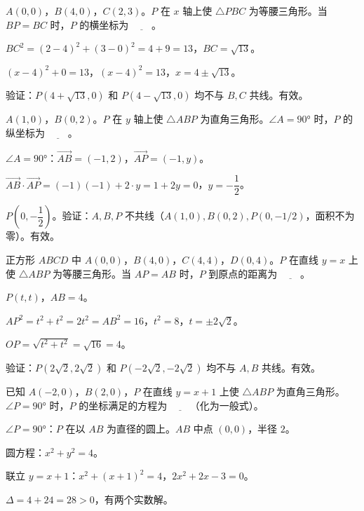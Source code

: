 \documentclass{exam-zh}
\begin{document}
\begin{question}[points=3]
  $A(0,0)$，$B(4,0)$，$C(2,3)$。$P$ 在 $x$ 轴上使 $\triangle PBC$ 为等腰三角形。当 $BP=BC$ 时，$P$ 的横坐标为 $\underline{\quad\quad}$。
  \fillin
  \paren[$x=4\pm\sqrt{13}$]
  \begin{solutionblock}
    $BC^2=(2-4)^2+(3-0)^2=4+9=13$，$BC=\sqrt{13}$。

$(x-4)^2+0=13$，$(x-4)^2=13$，$x=4\pm\sqrt{13}$。

验证：$P(4+\sqrt{13},0)$ 和 $P(4-\sqrt{13},0)$ 均不与 $B,C$ 共线。有效。
  \end{solutionblock}
\end{question}



\begin{question}[points=3]
  $A(1,0)$，$B(0,2)$。$P$ 在 $y$ 轴上使 $\triangle ABP$ 为直角三角形。$\angle A=90°$ 时，$P$ 的纵坐标为 $\underline{\quad\quad}$。
  \fillin
  \paren[$y=-\dfrac{1}{2}$]
  \begin{solutionblock}
    $\angle A=90°$：$\overrightarrow{AB}=(-1,2)$，$\overrightarrow{AP}=(-1,y)$。

$\overrightarrow{AB}\cdot\overrightarrow{AP}=(-1)(-1)+2\cdot y=1+2y=0$，$y=-\dfrac{1}{2}$。

$P\left(0,-\dfrac{1}{2}\right)$。验证：$A,B,P$ 不共线（$A(1,0),B(0,2),P(0,-1/2)$，面积不为零）。有效。
  \end{solutionblock}
\end{question}



\begin{question}[points=3]
  正方形 $ABCD$ 中 $A(0,0)$，$B(4,0)$，$C(4,4)$，$D(0,4)$。$P$ 在直线 $y=x$ 上使 $\triangle ABP$ 为等腰三角形。当 $AP=AB$ 时，$P$ 到原点的距离为 $\underline{\quad\quad}$。
  \fillin
  \paren[$4$]
  \begin{solutionblock}
    $P(t,t)$，$AB=4$。

$AP^2=t^2+t^2=2t^2=AB^2=16$，$t^2=8$，$t=\pm 2\sqrt{2}$。

$OP=\sqrt{t^2+t^2}=\sqrt{16}=4$。

验证：$P(2\sqrt{2},2\sqrt{2})$ 和 $P(-2\sqrt{2},-2\sqrt{2})$ 均不与 $A,B$ 共线。有效。
  \end{solutionblock}
\end{question}



\begin{question}[points=3]
  已知 $A(-2,0)$，$B(2,0)$，$P$ 在直线 $y=x+1$ 上使 $\triangle ABP$ 为直角三角形。$\angle P=90°$ 时，$P$ 的坐标满足的方程为 $\underline{\quad\quad}$（化为一般式）。
  \fillin
  \paren[$2x^2+2x-3=0$]
  \begin{solutionblock}
    $\angle P=90°$：$P$ 在以 $AB$ 为直径的圆上。$AB$ 中点 $(0,0)$，半径 $2$。

圆方程：$x^2+y^2=4$。

联立 $y=x+1$：$x^2+(x+1)^2=4$，$2x^2+2x-3=0$。

$\Delta=4+24=28>0$，有两个实数解。
  \end{solutionblock}
\end{question}
\end{document}
